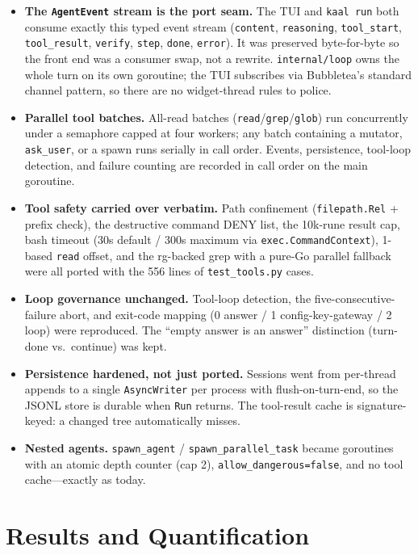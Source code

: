 \documentclass[11pt,a4paper]{article}
\newcommand{\go}[1]{\textcolor{gogreen}{\texttt{#1}}}
\begin{document}
\begin{itemize}[leftmargin=*,itemsep=0.35em]
  \item \textbf{The \texttt{AgentEvent} stream is the port seam.} The TUI and \texttt{kaal run} both consume exactly this typed event stream (\texttt{content}, \texttt{reasoning}, \texttt{tool\_start}, \texttt{tool\_result}, \texttt{verify}, \texttt{step}, \texttt{done}, \texttt{error}). It was preserved byte-for-byte so the front end was a consumer swap, not a rewrite. \go{internal/loop} owns the whole turn on its own goroutine; the TUI subscribes via Bubbletea's standard channel pattern, so there are no widget-thread rules to police.
  \item \textbf{Parallel tool batches.} All-read batches (\texttt{read}/\texttt{grep}/\texttt{glob}) run concurrently under a semaphore capped at four workers; any batch containing a mutator, \texttt{ask\_user}, or a spawn runs serially in call order. Events, persistence, tool-loop detection, and failure counting are recorded in call order on the main goroutine.
  \item \textbf{Tool safety carried over verbatim.} Path confinement (\texttt{filepath.Rel} + prefix check), the destructive command DENY list, the 10k-rune result cap, bash timeout (30s default / 300s maximum via \texttt{exec.CommandContext}), 1-based \texttt{read} offset, and the rg-backed grep with a pure-Go parallel fallback were all ported with the 556 lines of \texttt{test\_tools.py} cases.
  \item \textbf{Loop governance unchanged.} Tool-loop detection, the five-consecutive-failure abort, and exit-code mapping (0 answer / 1 config-key-gateway / 2 loop) were reproduced. The ``empty answer is an answer'' distinction (turn-done vs.\ continue) was kept.
  \item \textbf{Persistence hardened, not just ported.} Sessions went from per-thread appends to a single \texttt{AsyncWriter} per process with flush-on-turn-end, so the JSONL store is durable when \texttt{Run} returns. The tool-result cache is signature-keyed: a changed tree automatically misses.
  \item \textbf{Nested agents.} \texttt{spawn\_agent} / \texttt{spawn\_parallel\_task} became goroutines with an atomic depth counter (cap 2), \texttt{allow\_dangerous=false}, and no tool cache---exactly as today.
\end{itemize}

\section{Results and Quantification}
\end{document}
